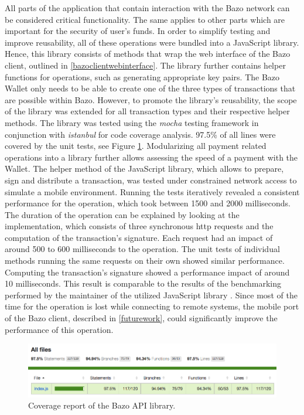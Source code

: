 All parts of the application that contain interaction with the Bazo network can be considered critical functionality. The same applies to other parts which are important for the security of user's funds. In order to simplify testing and improve reusability, all of these operations were bundled into a JavaScript library. Hence, this library consists of methods that wrap the web interface of the Bazo client, outlined in \ref{bazoclientwebinterface}. The library further contains helper functions for operations, such as generating appropriate key pairs. The Bazo Wallet only needs to be able to create one of the three types of transactions that are possible within Bazo. However, to promote the library's reusability, the scope of the library was extended for all transaction types and their respective helper methods.
The library was tested using the \textit{mocha} testing framework in conjunction with \textit{istanbul} for code coverage analysis. 97.5\% of all lines were covered by the unit tests, see Figure \ref{fig:coverage}. Modularizing all payment related operations into a library further allows assessing the speed of a payment with the Wallet. The helper method of the JavaScript library, which allows to prepare, sign and distribute a transaction, was tested under constrained network access to simulate a mobile environment. Running the tests iteratively revealed a consistent performance for the operation, which took between 1500 and 2000 milliseconds. The duration of the operation can be explained by looking at the implementation, which consists of three synchronous http requests and the computation of the transaction's signature. Each request had an impact of around 500 to 600 milliseconds to the operation. The unit tests of individual methods running the same requests on their own showed similar performance. Computing the transaction's signature showed a performance impact of around 10 milliseconds. This result is comparable to the results of the benchmarking performed by the maintainer of the utilized JavaScript library \cite{elliptic}.
Since most of the time for the operation is lost while connecting to remote systems, the mobile port of the Bazo client, described in \ref{futurework}, could significantly improve the performance of this operation.

\begin{figure}
\centering
\includegraphics[width=1\textwidth]{screenshots/bazo-api-testing.png}
\caption{\label{fig:coverage}Coverage report of the Bazo API library.}
\end{figure}

